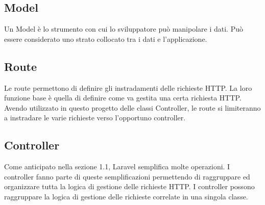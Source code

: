 \subsection{Model}
Un Model è lo strumento con cui lo sviluppatore può manipolare i dati. Può essere considerato uno strato collocato tra i dati e l'applicazione.

\subsection{Route}
Le route permettono di definire gli instradamenti delle richieste HTTP. La loro funzione base è quella di definire come va gestita una certa richiesta HTTP. Avendo utilizzato in questo progetto delle classi Controller, le route si limiteranno a instradare le varie richieste verso l'opportuno controller.

\subsection{Controller}
Come anticipato nella sezione 1.1, Laravel semplifica molte operazioni. I controller fanno parte di queste semplificazioni permettendo di raggruppare ed organizzare tutta la logica di gestione delle richieste HTTP. I controller possono raggruppare la logica di gestione delle richieste correlate in una singola classe.

